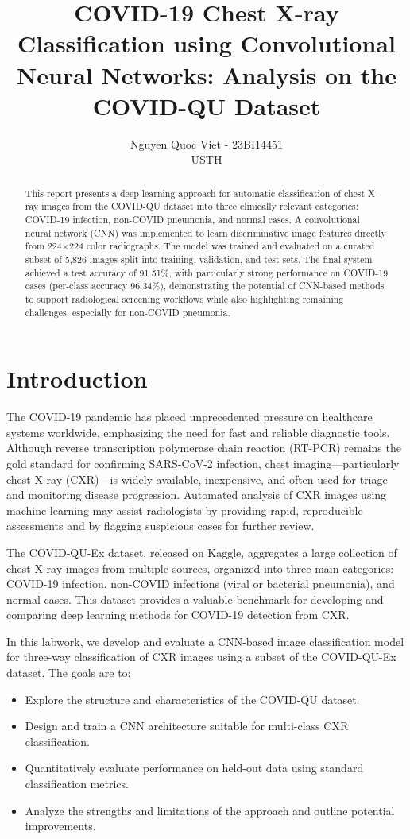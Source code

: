 \documentclass[conference]{IEEEtran}
\title{COVID-19 Chest X-ray Classification using Convolutional Neural Networks: Analysis on the COVID-QU Dataset}
\author{Nguyen Quoc Viet - 23BI14451\\USTH}
\begin{document}
\maketitle

\begin{abstract}
This report presents a deep learning approach for automatic classification of chest X-ray images from the COVID-QU dataset into three clinically relevant categories: COVID-19 infection, non-COVID pneumonia, and normal cases. A convolutional neural network (CNN) was implemented to learn discriminative image features directly from 224$\times$224 color radiographs. The model was trained and evaluated on a curated subset of 5{,}826 images split into training, validation, and test sets. The final system achieved a test accuracy of 91.51\%, with particularly strong performance on COVID-19 cases (per-class accuracy 96.34\%), demonstrating the potential of CNN-based methods to support radiological screening workflows while also highlighting remaining challenges, especially for non-COVID pneumonia.
\end{abstract}

\section{Introduction}

The COVID-19 pandemic has placed unprecedented pressure on healthcare systems worldwide, emphasizing the need for fast and reliable diagnostic tools. Although reverse transcription polymerase chain reaction (RT-PCR) remains the gold standard for confirming SARS-CoV-2 infection, chest imaging---particularly chest X-ray (CXR)---is widely available, inexpensive, and often used for triage and monitoring disease progression. Automated analysis of CXR images using machine learning may assist radiologists by providing rapid, reproducible assessments and by flagging suspicious cases for further review.

The COVID-QU-Ex dataset, released on Kaggle, aggregates a large collection of chest X-ray images from multiple sources, organized into three main categories: COVID-19 infection, non-COVID infections (viral or bacterial pneumonia), and normal cases. This dataset provides a valuable benchmark for developing and comparing deep learning methods for COVID-19 detection from CXR.

In this labwork, we develop and evaluate a CNN-based image classification model for three-way classification of CXR images using a subset of the COVID-QU-Ex dataset. The goals are to:
\begin{itemize}
    \item Explore the structure and characteristics of the COVID-QU dataset.
    \item Design and train a CNN architecture suitable for multi-class CXR classification.
    \item Quantitatively evaluate performance on held-out data using standard classification metrics.
    \item Analyze the strengths and limitations of the approach and outline potential improvements.
\end{itemize}
\end{document}
